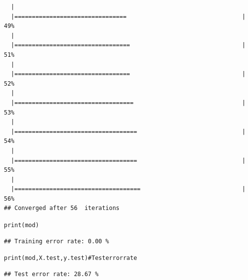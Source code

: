 \documentclass[class=article, crop=false]{standalone}\usepackage[]{graphicx}\usepackage[]{color}
\makeatletter
\newcommand{\hlcom}[1]{\textcolor[rgb]{0.588,0.588,0.588}{#1}}%
\newcommand{\hlstd}[1]{\textcolor[rgb]{0.196,0.196,0.196}{#1}}%
\newcommand{\hlkwd}[1]{\textcolor[rgb]{0.78,0.227,0.412}{#1}}%
\newenvironment{kframe}{%
 \def\at@end@of@kframe{}%
 \ifinner\ifhmode%
  \def\at@end@of@kframe{\end{minipage}}%
  \begin{minipage}{\columnwidth}%
 \fi\fi%
 \def\FrameCommand##1{\hskip\@totalleftmargin \hskip-\fboxsep
 \colorbox{shadecolor}{##1}\hskip-\fboxsep
     \hskip-\linewidth \hskip-\@totalleftmargin \hskip\columnwidth}%
 \MakeFramed {\advance\hsize-\width
   \@totalleftmargin\z@ \linewidth\hsize
   \@setminipage}}%
 {\par\unskip\endMakeFramed%
 \at@end@of@kframe}
\newenvironment{knitrout}{}{} %
\makeatother
\begin{document}
\begin{knitrout}
\begin{kframe}
\begin{verbatim}
  |                                                                       
  |================================                                 |  49%
  |                                                                       
  |=================================                                |  51%
  |                                                                       
  |=================================                                |  52%
  |                                                                       
  |==================================                               |  53%
  |                                                                       
  |===================================                              |  54%
  |                                                                       
  |===================================                              |  55%
  |                                                                       
  |====================================                             |  56%
## Converged after 56  iterations
\end{verbatim}
\begin{alltt}
\hlkwd{print}\hlstd{(mod)}
\end{alltt}
\begin{verbatim}
## Training error rate: 0.00 %
\end{verbatim}
\begin{alltt}
\hlkwd{print}\hlstd{(mod, X.test, y.test)}  \hlcom{# Test error rate}
\end{alltt}
\begin{verbatim}
## Test error rate: 28.67 %
\end{verbatim}
\end{kframe}
\end{knitrout}
\end{document}
